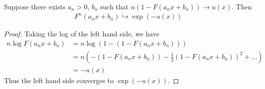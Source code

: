 \begin{lem}
  Suppose there exists $a_{n} > 0$, $b_{n}$ such that $n(1 - F(a_{n}
  x + b_{n})) \rightarrow{ u(x)}$.  Then
  \begin{align}
    \label{eq:125}
    F^{n}(a_{n} x + b_{n}) \hookrightarrow \exp(-u(x))
  \end{align}
\end{lem}

\begin{proof}
  Taking the log of the left hand side, we have
  \begin{align}
    \label{eq:126}
    n \log F(a_{n} x + b_{n}) &= n \log (1 - (1 - F(a_{n} x +
    b_{n}))) \\
    &= n (-(1 - F(a_{n} x + b_{n})) - \frac{1}{2} (1 - F(a_{n}x +
    b_{n}))^{2} + \dots) \\
    &= -u(x)
  \end{align}
  Thus the left hand side converges to $\exp(-u(x))$.
\end{proof}


